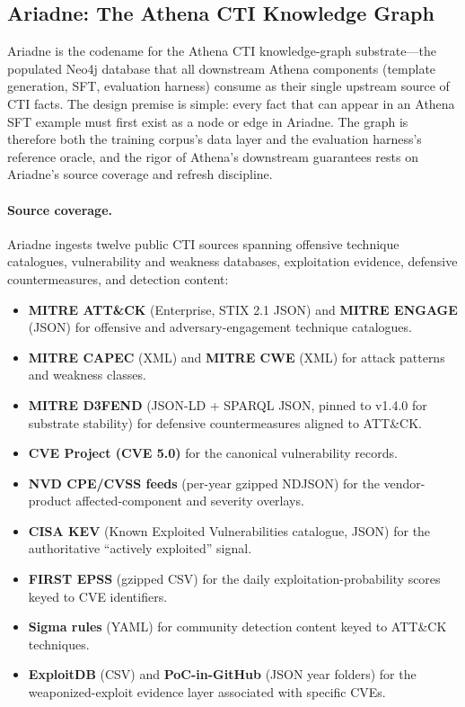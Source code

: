 \documentclass[conference]{IEEEtran}
\begin{document}
\subsection{Ariadne: The Athena CTI Knowledge Graph}
\label{sec:ariadne}

Ariadne is the codename for the Athena CTI knowledge-graph substrate---the populated Neo4j database that all downstream Athena components (template generation, SFT, evaluation harness) consume as their single upstream source of CTI facts. The design premise is simple: every fact that can appear in an Athena SFT example must first exist as a node or edge in Ariadne. The graph is therefore both the training corpus's data layer and the evaluation harness's reference oracle, and the rigor of Athena's downstream guarantees rests on Ariadne's source coverage and refresh discipline.

\paragraph{Source coverage.}
Ariadne ingests twelve public CTI sources spanning offensive technique catalogues, vulnerability and weakness databases, exploitation evidence, defensive countermeasures, and detection content:

\begin{itemize}
  \item \textbf{MITRE ATT\&CK} (Enterprise, STIX 2.1 JSON) and \textbf{MITRE ENGAGE} (JSON) for offensive and adversary-engagement technique catalogues.
  \item \textbf{MITRE CAPEC} (XML) and \textbf{MITRE CWE} (XML) for attack patterns and weakness classes.
  \item \textbf{MITRE D3FEND} (JSON-LD + SPARQL JSON, pinned to v1.4.0 for substrate stability) for defensive countermeasures aligned to ATT\&CK.
  \item \textbf{CVE Project (CVE 5.0)} for the canonical vulnerability records.
  \item \textbf{NVD CPE/CVSS feeds} (per-year gzipped NDJSON) for the vendor-product affected-component and severity overlays.
  \item \textbf{CISA KEV} (Known Exploited Vulnerabilities catalogue, JSON) for the authoritative ``actively exploited'' signal.
  \item \textbf{FIRST EPSS} (gzipped CSV) for the daily exploitation-probability scores keyed to CVE identifiers.
  \item \textbf{Sigma rules} (YAML) for community detection content keyed to ATT\&CK techniques.
  \item \textbf{ExploitDB} (CSV) and \textbf{PoC-in-GitHub} (JSON year folders) for the weaponized-exploit evidence layer associated with specific CVEs.
\end{itemize}
\end{document}
